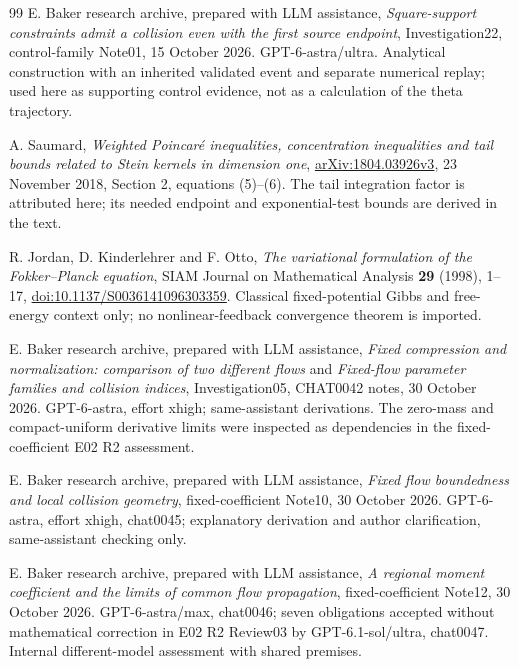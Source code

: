 \documentclass[11pt]{article}
\numberwithin{equation}{section}
\begin{document}
\begin{thebibliography}{99}
E. Baker research archive, prepared with LLM assistance,
\emph{Square-support constraints admit a collision even with the first
source endpoint}, Investigation22, control-family Note01,
15 October 2026. GPT-6-astra/ultra. Analytical construction with an
inherited validated event and separate numerical replay; used here as
supporting control evidence, not as a calculation of the theta trajectory.

A. Saumard, \emph{Weighted Poincar\'e inequalities, concentration
inequalities and tail bounds related to Stein kernels in dimension one},
\href{https://arxiv.org/abs/1804.03926v3}{arXiv:1804.03926v3},
23 November 2018, Section 2, equations (5)--(6).
The tail integration factor is attributed here; its needed endpoint
and exponential-test bounds are derived in the text.

R. Jordan, D. Kinderlehrer and F. Otto,
\emph{The variational formulation of the Fokker--Planck equation},
SIAM Journal on Mathematical Analysis \textbf{29} (1998), 1--17,
\href{https://doi.org/10.1137/S0036141096303359}{doi:10.1137/S0036141096303359}.
Classical fixed-potential Gibbs and free-energy context only; no
nonlinear-feedback convergence theorem is imported.

E. Baker research archive, prepared with LLM assistance,
\emph{Fixed compression and normalization: comparison of two different
flows} and \emph{Fixed-flow parameter families and collision indices},
Investigation05, CHAT0042 notes, 30 October 2026.
GPT-6-astra, effort xhigh; same-assistant derivations.
The zero-mass and compact-uniform derivative limits were inspected as
dependencies in the fixed-coefficient E02 R2 assessment.

E. Baker research archive, prepared with LLM assistance,
\emph{Fixed flow boundedness and local collision geometry},
fixed-coefficient Note10, 30 October 2026.
GPT-6-astra, effort xhigh, chat0045; explanatory derivation and
author clarification, same-assistant checking only.

E. Baker research archive, prepared with LLM assistance,
\emph{A regional moment coefficient and the limits of common flow
propagation}, fixed-coefficient Note12, 30 October 2026.
GPT-6-astra/max, chat0046; seven obligations accepted without
mathematical correction in E02 R2 Review03 by GPT-6.1-sol/ultra,
chat0047. Internal different-model assessment with shared premises.


\end{thebibliography}
\end{document}

